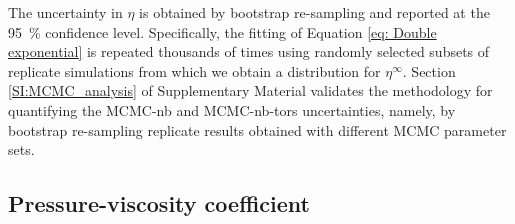 \documentclass[preprint,review,12pt]{elsarticle}
\begin{document}
	 
	The uncertainty in $\eta$ is obtained by bootstrap re-sampling and reported at the 95~\% confidence level. Specifically, the fitting of Equation \ref{eq: Double exponential} is repeated thousands of times using randomly selected subsets of replicate simulations from which we obtain a distribution for $\eta^{\infty}$. Section \ref{SI:MCMC_analysis} of Supplementary Material validates the methodology for quantifying the MCMC-nb and MCMC-nb-tors uncertainties, namely, by bootstrap re-sampling replicate results obtained with different MCMC parameter sets. 
		
%	
	
	
	\subsection{Pressure-viscosity coefficient} \label{Pressure-viscosity coefficient}
	
\end{document}
